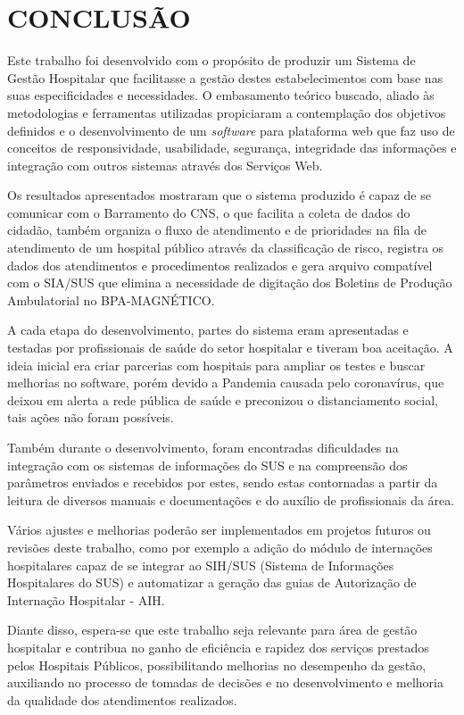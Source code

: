 \chapter{CONCLUSÃO}

Este trabalho foi desenvolvido com o propósito de produzir um Sistema de Gestão Hospitalar que facilitasse a gestão destes estabelecimentos com base nas suas especificidades e necessidades. O embasamento teórico buscado, aliado às metodologias e ferramentas utilizadas propiciaram a contemplação dos objetivos definidos e o desenvolvimento de um \textit{software} para plataforma web que faz uso de conceitos de responsividade, usabilidade, segurança, integridade das informações e integração com outros sistemas através dos Serviços Web.

Os resultados apresentados mostraram que o sistema produzido é capaz de se comunicar com o Barramento do CNS, o que facilita a coleta de dados do cidadão, também organiza o fluxo de atendimento e de prioridades na fila de atendimento de um hospital público através da classificação de risco, registra os dados dos atendimentos e procedimentos realizados e gera arquivo compatível com o SIA/SUS que elimina a necessidade de digitação dos Boletins de Produção Ambulatorial no BPA-MAGNÉTICO.

A cada etapa do desenvolvimento, partes do sistema eram apresentadas e testadas por profissionais de saúde do setor hospitalar e tiveram boa aceitação. A ideia inicial era criar parcerias com hospitais para ampliar os testes e buscar melhorias no software, porém devido a Pandemia causada pelo coronavírus, que deixou em alerta a rede pública de saúde e preconizou o distanciamento social, tais ações não foram possíveis.

Também durante o desenvolvimento, foram encontradas dificuldades na integração com os sistemas de informações do SUS e na compreensão dos parâmetros enviados e recebidos por estes, sendo estas contornadas a partir da leitura de diversos manuais e documentações e do auxílio de profissionais da área.

Vários ajustes e melhorias poderão ser implementados em projetos futuros ou revisões deste trabalho, como por exemplo a adição do módulo de internações hospitalares capaz de se integrar ao SIH/SUS (Sistema de Informações Hospitalares do SUS) e automatizar a geração das guias de Autorização de Internação Hospitalar - AIH.


Diante disso, espera-se que este trabalho seja relevante para área de gestão hospitalar e contribua no ganho de eficiência e rapidez dos serviços prestados pelos Hospitais Públicos, possibilitando melhorias no desempenho da gestão, auxiliando no processo de tomadas de decisões e no desenvolvimento e melhoria da qualidade dos atendimentos realizados.


